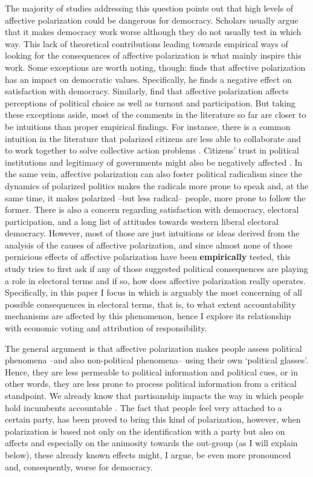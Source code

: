 \documentclass[a4paper, svgnames]{article}
\begin{document}
The majority of studies addressing this question points out that high levels of affective polarization could be dangerous for democracy. Scholars usually argue that it makes democracy work worse although they do not usually test in which way. This lack of theoretical contributions leading towards empirical ways of looking for the consequences of affective polarization is what mainly inspire this work. Some exceptions are worth noting, though: \cite{Wagner2021} finds that affective polarization has an impact on democratic values. Specifically, he finds a negative effect on satisfaction with democracy. Similarly, \cite{Ward2019} find that affective polarization affects perceptions of political choice as well as turnout and participation. But taking these exceptions aside, most of the comments in the literature so far are closer to be intuitions than proper empirical findings. For instance, there is a common intuition in the literature that polarized citizens are less able to collaborate and to work together to solve collective action problems \citep{Garrett2014}. Citizens' trust in political institutions and legitimacy of governments might also be negatively affected \citep{Orriols2021}. In the same vein, affective polarization can also foster political radicalism \citep{Levendusky2013, Rogowski2016a, Webster2017} since the dynamics of polarized politics makes the radicals more prone to speak and, at the same time, it makes polarized --but less radical-- people, more prone to follow the former. There is also a concern regarding satisfaction with democracy, electoral participation, and a long list of attitudes towards western liberal electoral democracy. However, most of those are just intuitions or ideas derived from the analysis of the causes of affective polarization, and since almost none of those pernicious effects of affective polarization have been \textbf{empirically} tested, this study tries to first ask if any of those suggested political consequences are playing a role in electoral terms and if so, how does affective polarization really operates. Specifically, in this paper I focus in which is arguably the most concerning of all possible consequences in electoral terms, that is, to what extent accountability mechanisms are affected by this phenomenon, hence I explore its relationship with economic voting and attribution of responsibility.

The general argument is that affective polarization makes people assess political phenomena --and also non-political phenomena-- using their own `political glasses'. Hence, they are less permeable to political information and political cues, or in other words, they are less prone to process political information from a critical standpoint. We already know that partisanship impacts the way in which people hold incumbents accountable \citet*{tilleyGovernmentBlameExperimental2011a}. The fact that people feel very attached to a certain party, has been proved to bring this kind of polarization, however, when polarization is based not only on the identification with a party but also on affects and especially on the animosity towards the out-group (as I will explain below), these already known effects might, I argue, be even more pronounced and, consequently, worse for democracy. 
\end{document}

